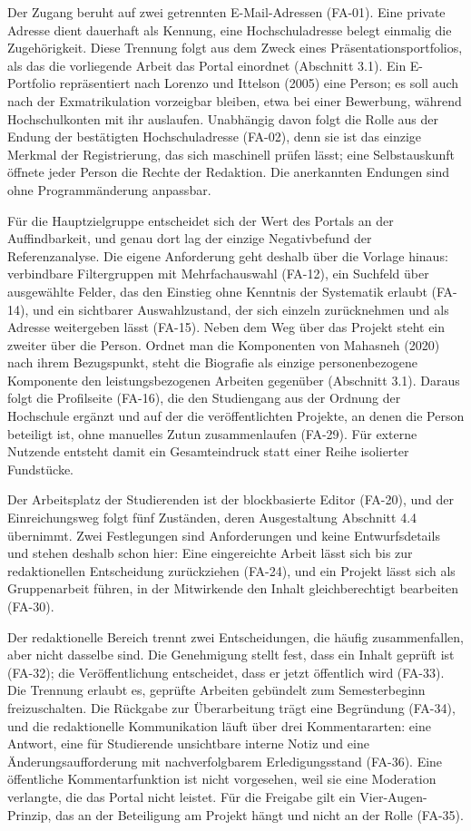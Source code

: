 Der Zugang beruht auf zwei getrennten E-Mail-Adressen (FA-01). Eine private Adresse dient dauerhaft als Kennung, eine Hochschuladresse belegt einmalig die Zugehörigkeit. Diese Trennung folgt aus dem Zweck eines Präsentationsportfolios, als das die vorliegende Arbeit das Portal einordnet (Abschnitt 3.1). Ein E-Portfolio repräsentiert nach Lorenzo und Ittelson (2005) eine Person; es soll auch nach der Exmatrikulation vorzeigbar bleiben, etwa bei einer Bewerbung, während Hochschulkonten mit ihr auslaufen. Unabhängig davon folgt die Rolle aus der Endung der bestätigten Hochschuladresse (FA-02), denn sie ist das einzige Merkmal der Registrierung, das sich maschinell prüfen lässt; eine Selbstauskunft öffnete jeder Person die Rechte der Redaktion. Die anerkannten Endungen sind ohne Programmänderung anpassbar.

Für die Hauptzielgruppe entscheidet sich der Wert des Portals an der Auffindbarkeit, und genau dort lag der einzige Negativbefund der Referenzanalyse. Die eigene Anforderung geht deshalb über die Vorlage hinaus: verbindbare Filtergruppen mit Mehrfachauswahl (FA-12), ein Suchfeld über ausgewählte Felder, das den Einstieg ohne Kenntnis der Systematik erlaubt (FA-14), und ein sichtbarer Auswahlzustand, der sich einzeln zurücknehmen und als Adresse weitergeben lässt (FA-15). Neben dem Weg über das Projekt steht ein zweiter über die Person. Ordnet man die Komponenten von Mahasneh (2020) nach ihrem Bezugspunkt, steht die Biografie als einzige personenbezogene Komponente den leistungsbezogenen Arbeiten gegenüber (Abschnitt 3.1). Daraus folgt die Profilseite (FA-16), die den Studiengang aus der Ordnung der Hochschule ergänzt und auf der die veröffentlichten Projekte, an denen die Person beteiligt ist, ohne manuelles Zutun zusammenlaufen (FA-29). Für externe Nutzende entsteht damit ein Gesamteindruck statt einer Reihe isolierter Fundstücke.

Der Arbeitsplatz der Studierenden ist der blockbasierte Editor (FA-20), und der Einreichungsweg folgt fünf Zuständen, deren Ausgestaltung Abschnitt 4.4 übernimmt. Zwei Festlegungen sind Anforderungen und keine Entwurfsdetails und stehen deshalb schon hier: Eine eingereichte Arbeit lässt sich bis zur redaktionellen Entscheidung zurückziehen (FA-24), und ein Projekt lässt sich als Gruppenarbeit führen, in der Mitwirkende den Inhalt gleichberechtigt bearbeiten (FA-30).

Der redaktionelle Bereich trennt zwei Entscheidungen, die häufig zusammenfallen, aber nicht dasselbe sind. Die Genehmigung stellt fest, dass ein Inhalt geprüft ist (FA-32); die Veröffentlichung entscheidet, dass er jetzt öffentlich wird (FA-33). Die Trennung erlaubt es, geprüfte Arbeiten gebündelt zum Semesterbeginn freizuschalten. Die Rückgabe zur Überarbeitung trägt eine Begründung (FA-34), und die redaktionelle Kommunikation läuft über drei Kommentararten: eine Antwort, eine für Studierende unsichtbare interne Notiz und eine Änderungsaufforderung mit nachverfolgbarem Erledigungsstand (FA-36). Eine öffentliche Kommentarfunktion ist nicht vorgesehen, weil sie eine Moderation verlangte, die das Portal nicht leistet. Für die Freigabe gilt ein Vier-Augen-Prinzip, das an der Beteiligung am Projekt hängt und nicht an der Rolle (FA-35).

